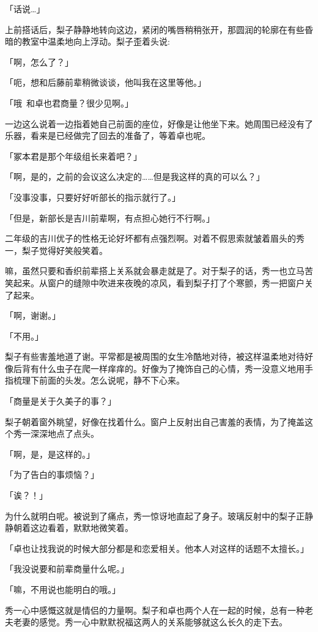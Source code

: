 \documentclass[UTF8]{ctexart}
\begin{document}
    「话说…」

    上前搭话后，梨子静静地转向这边，紧闭的嘴唇稍稍张开，那圆润的轮廓在有些昏暗的教室中温柔地向上浮动。梨子歪着头说:

    「啊，怎么了？」

    「呃，想和后藤前辈稍微谈谈，他叫我在这里等他。」

    「哦~和卓也君商量？很少见啊。」

    一边这么说着一边指着她自己前面的座位，好像是让他坐下来。她周围已经没有了乐器，看来是已经做完了回去的准备了，等着卓也呢。

    「冢本君是那个年级组长来着吧？」

    「啊，是的，之前的会议这么决定的……但是我这样的真的可以么？」

    「没事没事，只要好好听部长的指示就行了。」

    「但是，新部长是吉川前辈啊，有点担心她行不行啊。」

    二年级的吉川优子的性格无论好坏都有点强烈啊。对着不假思索就皱着眉头的秀一，梨子觉得好笑般笑着。

    嘛，虽然只要和香织前辈搭上关系就会暴走就是了。对于梨子的话，秀一也立马苦笑起来。从窗户的缝隙中吹进来夜晚的凉风，看到梨子打了个寒颤，秀一把窗户关了起来。

    「啊，谢谢。」

    「不用。」

    梨子有些害羞地道了谢。平常都是被周围的女生冷酷地对待，被这样温柔地对待好像后背有什么虫子在爬一样痒痒的。好像为了掩饰自己的心情，秀一没意义地用手指梳理下前面的头发。怎么说呢，静不下心来。

    「商量是关于久美子的事？」

    梨子朝着窗外眺望，好像在找着什么。窗户上反射出自己害羞的表情，为了掩盖这个秀一深深地点了点头。

    「啊，是，是这样的。」

    「为了告白的事烦恼？」

    「诶？！」

    为什么就明白呢。被说到了痛点，秀一惊讶地直起了身子。玻璃反射中的梨子正静静朝着这边看着，默默地微笑着。

    「卓也让找我说的时候大部分都是和恋爱相关。他本人对这样的话题不太擅长。」

    「我没说要和前辈商量什么呢。」

    「嘛，不用说也能明白的哦。」

    秀一心中感慨这就是情侣的力量啊。梨子和卓也两个人在一起的时候，总有一种老夫老妻的感觉。秀一心中默默祝福这两人的关系能够就这么长久的走下去。
\end{document}
